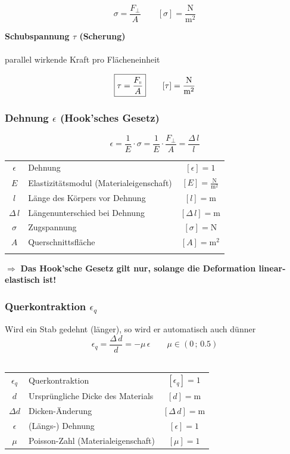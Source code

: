 				$$ \boxed{ \sigma = \frac{F_{\perp}}{A} } \qquad [\sigma] = \mathrm{\frac{N}{m^2}}$$ 

			\textbf{Schubspannung $\tau$ (Scherung)} \\
				\\
				parallel wirkende Kraft pro Flächeneinheit 
				
				$$ \boxed{ \tau = \frac{F_{\shortparallel}}{A} } \qquad [\tau] = \mathrm{\frac{N}{m^2}}$$

		\subsubsection{Dehnung $\epsilon$ (Hook'sches Gesetz)}
			$$ \boxed{ \epsilon = \frac{1}{E} \cdot \sigma = \frac{1}{E} \cdot \frac{F_{\perp}}{A} = \frac{\Delta \, l}{l} } $$ 

			\begin{tabular}{c l c}
				$\epsilon$ & Dehnung & $[\epsilon] = 1$ \\
				$E$ & Elastizitätsmodul (Materialeigenschaft) & $[E] = \mathrm{\frac{N}{m^2}}$ \\
				$l$ & Länge des Körpers vor Dehnung & $[l] = \mathrm{m}$ \\
				$\Delta \, l$ & Längenunterschied bei Dehnung & $[\Delta \, l] = \mathrm{m}$ \\
				$\sigma$ & Zugspannung & $[\sigma] = \mathrm{N}$ \\
				$A$ & Querschnittsfläche & $[A] = \mathrm{m^2}$ \\
				\\
			\end{tabular}
			
			$\Rightarrow$ \textbf{Das Hook'sche Gesetz gilt nur, solange die Deformation linear-elastisch ist!}


		\subsubsection{Querkontraktion $\epsilon_q$}
			Wird ein Stab gedehnt (länger), so wird er automatisch auch dünner \\		
			
			$$ \boxed{ \epsilon_q = \frac{\Delta \, d}{d} = - \mu \, \epsilon } \qquad \mu \in (0 \, ; \, 0.5)$$ \\
			
			\begin{tabular}{c l c}
				$\epsilon_q$ & Querkontraktion & $[\epsilon_q] = 1$ \\
				$d$ & Ursprüngliche Dicke des Materials & $[d] = \mathrm{m}$ \\
				$\Delta d$ & Dicken-Änderung & $[ \Delta \, d] = \mathrm{m}$ \\
				$\epsilon$ & (Längs-) Dehnung & $[\epsilon] = 1$ \\
				$\mu$ & Poisson-Zahl (Materialeigenschaft) & $[\mu] = 1$ \\
			\end{tabular}
		
